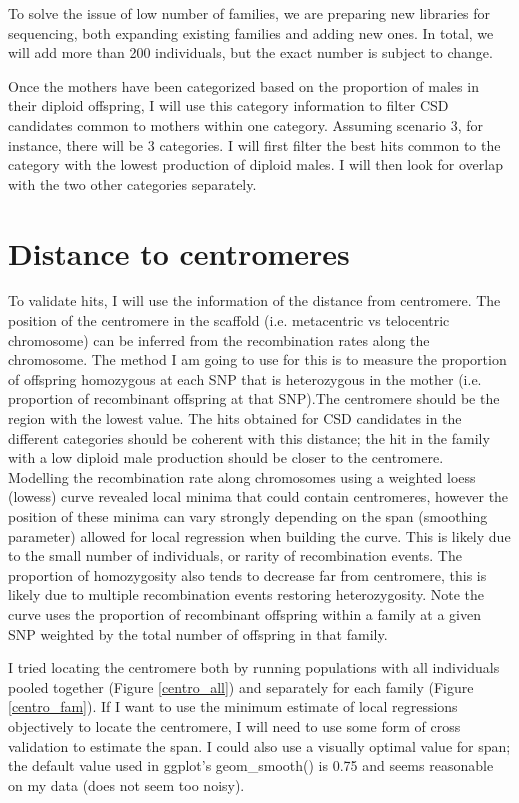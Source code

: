 \documentclass[10pt,a4paper]{report}
\begin{document}
To solve the issue of low number of families, we are preparing new libraries for sequencing, both expanding existing families and adding new ones. In total, we will add more than 200 individuals, but the exact number is subject to change.

Once the mothers have been categorized based on the proportion of males in their diploid offspring, I will use this category information to filter CSD candidates common to mothers within one category.
Assuming scenario 3, for instance, there will be 3 categories. I will first filter the best hits common to the category with the lowest production of diploid males. I will then look for overlap with the two other categories separately.

\section{Distance to centromeres}

To validate hits, I will use the information of the distance from centromere. The position of the centromere in the scaffold (i.e. metacentric vs telocentric chromosome) can be inferred from the recombination rates along the chromosome. The method I am going to use for this is to measure the proportion of offspring homozygous at each SNP that is heterozygous in the mother (i.e. proportion of recombinant offspring at that SNP).The centromere should be the region with the lowest value.
The hits obtained for CSD candidates in the different categories should be coherent with this distance; the hit in the family with a low diploid male production should be closer to the centromere.\\

Modelling the recombination rate along chromosomes using a weighted loess (lowess) curve revealed local minima that could contain centromeres, however the position of these minima can vary strongly depending on the span (smoothing parameter) allowed for local regression when building the curve. This is likely due to the small number of individuals, or rarity of recombination events. The proportion of homozygosity also tends to decrease far from centromere, this is likely due to multiple recombination events restoring heterozygosity. Note the curve uses the proportion of recombinant offspring within a family at a given SNP weighted by the total number of offspring in that family.

I tried locating the centromere both by running populations with all individuals pooled together (Figure \ref{centro_all}) and separately for each family (Figure \ref{centro_fam}). If I want to use the minimum estimate of local regressions objectively to locate the centromere, I will need to use some form of cross validation to estimate the span. I could also use a visually optimal value for span; the default value used in ggplot's geom\_smooth() is 0.75 and seems reasonable on my data (does not seem too noisy).\\
\end{document}
